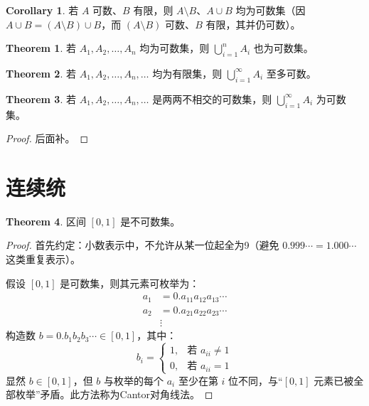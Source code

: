 \documentclass[oneside]{book}
\theoremstyle{definition}
\newtheorem{theorem}{Theorem}[section]
\newtheorem{corollary}{Corollary}[section]
\begin{document}
\begin{corollary}
	若 \( A \) 可数、\( B \) 有限，则 \( A \setminus B \)、\( A \cup B \) 均为可数集（因 \( A \cup B = (A \setminus B) \cup B \)，而 \( (A \setminus B) \) 可数、\( B \) 有限，其并仍可数）。
\end{corollary}

\begin{theorem}
	若 \( A_1, A_2, \dots, A_n \) 均为可数集，则 \( \bigcup_{i=1}^n A_i \) 也为可数集。
\end{theorem}

\begin{theorem}
	若 \( A_1, A_2, \dots, A_n, \dots \) 均为有限集，则 \( \bigcup_{i=1}^\infty A_i \) 至多可数。
\end{theorem}

\begin{theorem}
	若 \( A_1, A_2, \dots, A_n, \dots \) 是两两不相交的可数集，则 \( \bigcup_{i=1}^\infty A_i \) 为可数集。
\end{theorem}

\begin{proof}
	后面补。
\end{proof}

\section{连续统}

\begin{theorem}
	区间 \( [0,1] \) 是不可数集。
\end{theorem}

\begin{proof}
	首先约定：小数表示中，不允许从某一位起全为9（避免 \( 0.999\cdots = 1.000\cdots \) 这类重复表示）。
	
	假设 \( [0,1] \) 是可数集，则其元素可枚举为：
	\[
	\begin{aligned}
		a_1 &= 0.a_{11}a_{12}a_{13}\cdots \\
		a_2 &= 0.a_{21}a_{22}a_{23}\cdots \\
		&\vdots
	\end{aligned}
	\]
	构造数 \( b = 0.b_1b_2b_3\cdots \in [0,1] \)，其中：
	\[
	b_i = \begin{cases}
		1, & \text{若 } a_{ii} \neq 1 \\
		0, & \text{若 } a_{ii} = 1
	\end{cases}
	\]
	显然 \( b \in [0,1] \)，但 \( b \) 与枚举的每个 \( a_i \) 至少在第 \( i \) 位不同，与“\( [0,1] \) 元素已被全部枚举”矛盾。此方法称为Cantor对角线法。
\end{proof}
\end{document}
